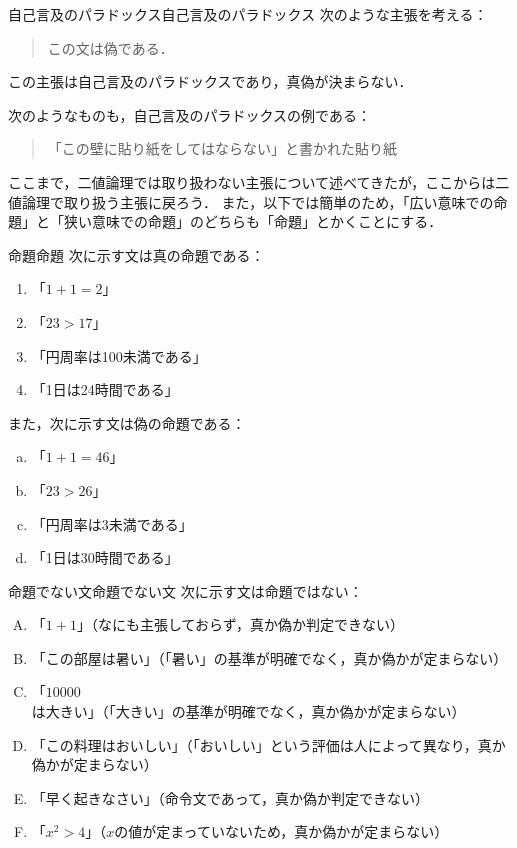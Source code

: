 \begin{example}{自己言及のパラドックス}{自己言及のパラドックス}
次のような主張を考える：
\begin{quote}
この文は偽である．
\end{quote}
この主張は自己言及のパラドックスであり，真偽が決まらない．

次のようなものも，自己言及のパラドックスの例である：
\begin{quote}
「この壁に貼り紙をしてはならない」と書かれた貼り紙
\end{quote}
\end{example}

ここまで，二値論理では取り扱わない主張について述べてきたが，ここからは二値論理で取り扱う主張に戻ろう．
また，以下では簡単のため，「広い意味での命題」と「狭い意味での命題」のどちらも「命題」とかくことにする．

\begin{example}{命題}{命題}
次に示す文は真の命題である：
\begin{enumerate}[(1)]
\item 「$1+1=2$」
\item 「$23 > 17$」
\item 「円周率は100未満である」
\item 「1日は24時間である」
\end{enumerate}
また，次に示す文は偽の命題である：
\begin{enumerate}[(a)]
\item 「$1+1=46$」
\item 「$23>26$」
\item 「円周率は3未満である」
\item 「1日は30時間である」
\end{enumerate}
\end{example}

\begin{example}{命題でない文}{命題でない文}
次に示す文は命題ではない：
\begin{enumerate}[(A)]
\item 「$1+1$」（なにも主張しておらず，真か偽か判定できない）
\item 「この部屋は暑い」（「暑い」の基準が明確でなく，真か偽かが定まらない）
\item 「$10000$は大きい」（「大きい」の基準が明確でなく，真か偽かが定まらない）
\item 「この料理はおいしい」（「おいしい」という評価は人によって異なり，真か偽かが定まらない）
\item 「早く起きなさい」（命令文であって，真か偽か判定できない）
\item 「$x^2 > 4$」（$x$の値が定まっていないため，真か偽かが定まらない）\label{enu:命題でない文4}
\end{enumerate}
\end{example}

